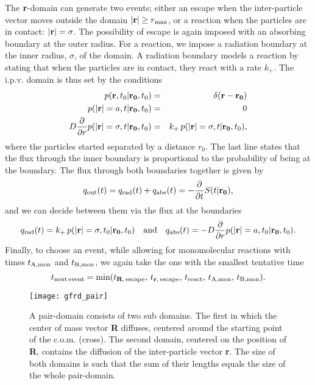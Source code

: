 The ${\bf r}$-domain can generate two events; either an escape when the inter-particle vector moves outside the domain $|{\bf r}|\geq  r_{\rm max}$, or a reaction when the particles are in contact: $|{\bf r}|=\sigma$. The possibility of escape is again imposed with an absorbing boundary at the outer radius. For a reaction, we impose a radiation boundary at the inner radius, $\sigma$, of the domain. A radiation boundary models a reaction by stating that when the particles are in contact, they react with a rate $k_+$. The i.p.v. domain is thus set by the conditions
\setlength{\jot}{10pt}
\begin{eqnarray}
 p({\bf r}, t_0|{\bf r_0},t_0) & = & \delta(\mathbf{r - r_0}) \\
 p({\bf |r|}=a, t|{\bf r_0},t_0) & = & 0 \\
 D \frac{\partial }{\partial r} p({\bf |r|}=\sigma, t|{\bf r_0},t_0) & = & k_+\,p({\bf |r|}=\sigma, t|{\bf r_0},t_0),
\end{eqnarray}
where the particles started separated by a distance $r_0$. The last line states that the flux through the inner boundary is proportional to the probability of being at the boundary. The flux through both boundaries together is given by
\begin{equation}
 q_{\rm out}(t) = q_{\rm rad}(t) + q_{\rm abs}(t) = -\frac{\partial }{\partial t} S(t|{\bf r_0}),
\end{equation}
and we can decide between them via the flux at the boundaries
\begin{equation}
q_{\rm rad}(t) = k_+ \, p({\bf |r|}=\sigma, t_0|{\bf r_0},t_0) \quad{\rm and}\quad q_{\rm abs}(t) = - D \frac{\partial }{\partial r} p({\bf |r|}=a, t_0|{\bf r_0},t_0).
\end{equation}
Finally, to choose an event, while allowing for monomolecular reactions with times $t_{\rm A, mon}$ and $t_{\rm B, mon}$, we again take the one with the smallest tentative time
\begin{equation}
 t_{\rm next\,event} = {\rm min}(t_{{\bf R},\,{\rm escape}},\,t_{{\bf r},\,{\rm escape}},\,t_{\rm react},\,t_{\rm A, mon},\,t_{\rm B, mon}).
\end{equation}

\begin{figure}[ht]
\centering
\texttt{[image: gfrd\_pair]}
\caption{ A pair-domain consists of two sub domains. The first in which the center of mass vector {\bf R} diffuses, centered around the starting point of the c.o.m. (cross). The second domain, centered on the position of {\bf R}, contains the diffusion of the inter-particle vector {\bf r}. The size of both domains is such that the sum of their lengths equals the size of the whole pair-domain. }
\end{figure}

